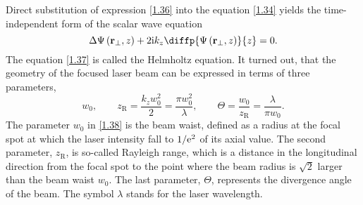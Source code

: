 Direct substitution of expression \ref{1.36} into the equation \ref{1.34} yields the time-independent form of the scalar wave equation
\begin{equation}
\label{1.37}
\laplace{\Psi \left(\vec{r_\bot}, z \right)} + 2 \i k_z \diffp{\Psi \left(\vec{r_\bot}, z \right)}{z} = 0.
\end{equation}
The equation \ref{1.37} is called the Helmholtz equation. It turned out, that the geometry of the focused laser beam can be expressed in terms of three parameters,
\begin{equation}
\label{1.38}
w_0, \qquad z_{\mathrm{R}} = \frac{k_z w_0^2}{2} = \frac{\pi w_0^2}{\lambda}, \qquad \Theta = \frac{w_0}{z_\mathrm{R}} = \frac{\lambda}{\pi w_0}.
\end{equation}
The parameter $ w_0 $ in \ref{1.38} is the beam waist, defined as a radius at the focal spot at which the laser intensity fall to $ 1/\mathrm{e}^2 $ of its axial value. The second parameter, $ z_\mathrm{R} $, is so-called Rayleigh range, which is a distance in the longitudinal direction from the focal spot to the point where the beam radius is $ \sqrt{2} $ larger than the beam waist $ w_0 $. The last parameter, $ \Theta $, represents the divergence angle of the beam. The symbol $ \lambda $ stands for the laser wavelength.

